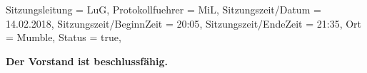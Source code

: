 



\begin{Protokoll}{
		Sitzungsleitung                 = {LuG},             %
		Protokollfuehrer                = {MiL},              %
		Sitzungszeit/Datum              = {14.02.2018},       %
		Sitzungszeit/BeginnZeit         = {20:05},            %
		Sitzungszeit/EndeZeit           = {21:35},            %
		Ort                             = {Mumble},            %
		Status                          = {true},            %
	}
	    
	    
	\begin{Anwesenheitsliste}
	\end{Anwesenheitsliste}
	    
	\textbf{Der Vorstand ist beschlussfähig.}
	
	    
	

\end{Protokoll}
